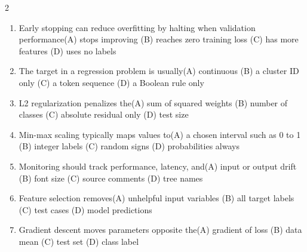\documentclass[a4paper]{article}
\begin{document}
\begin{multicols*}{2}
\begin{enumerate}[resume]
\item Early stopping can reduce overfitting by halting when validation performance\newline\hspace*{0.6em}(A) stops improving \quad (B) reaches zero training loss \newline\hspace*{0.6em}(C) has more features \quad (D) uses no labels
\item The target in a regression problem is usually\newline\hspace*{0.6em}(A) continuous \quad (B) a cluster ID only \newline\hspace*{0.6em}(C) a token sequence \quad (D) a Boolean rule only
\item L2 regularization penalizes the\newline\hspace*{0.6em}(A) sum of squared weights \quad (B) number of classes \newline\hspace*{0.6em}(C) absolute residual only \quad (D) test size
\item Min-max scaling typically maps values to\newline\hspace*{0.6em}(A) a chosen interval such as 0 to 1 \quad (B) integer labels \newline\hspace*{0.6em}(C) random signs \quad (D) probabilities always
\item Monitoring should track performance, latency, and\newline\hspace*{0.6em}(A) input or output drift \quad (B) font size \newline\hspace*{0.6em}(C) source comments \quad (D) tree names
\item Feature selection removes\newline\hspace*{0.6em}(A) unhelpful input variables \quad (B) all target labels \newline\hspace*{0.6em}(C) test cases \quad (D) model predictions
\item Gradient descent moves parameters opposite the\newline\hspace*{0.6em}(A) gradient of loss \quad (B) data mean \newline\hspace*{0.6em}(C) test set \quad (D) class label

\end{enumerate}
\end{multicols*}
\end{document}
